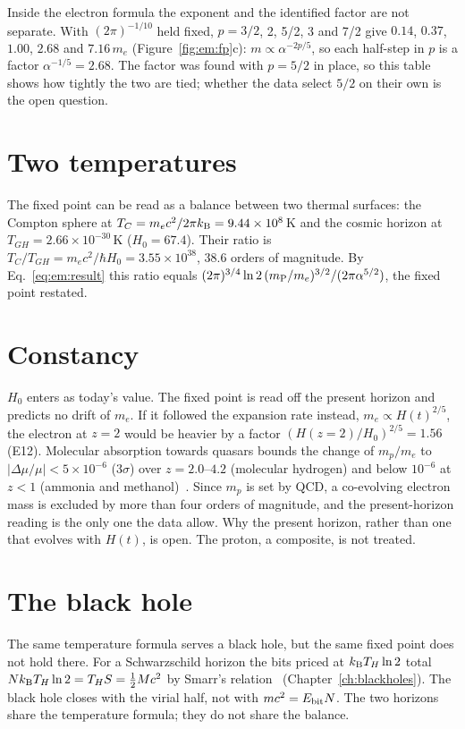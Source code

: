 Inside the electron formula the exponent and the identified factor are not separate. With $(2\pi)^{-1/10}$ held fixed, $p=3/2$, 2, 5/2, 3 and
7/2 give $0.14$, $0.37$, $1.00$, $2.68$ and $7.16\,m_e$ (Figure~\ref{fig:em:fp}c): $m\propto\alpha^{-2p/5}$, so each half-step in $p$ is a factor
$\alpha^{-1/5}=2.68$. \calc{} The factor was found with $p=5/2$ in place, so this table shows how tightly the two are tied; whether the data select $5/2$ on their own is the open question.

\section{Two temperatures}\label{sec:em:temps}
The fixed point can be read as a balance between two thermal surfaces: the Compton sphere at $T_C=m_ec^2/2\pi k_{\mathrm B}=9.44\times10^8$\,K and the cosmic
horizon at $T_{GH}=2.66\times10^{-30}$\,K ($H_0=67.4$). Their ratio is $T_C/T_{GH}=m_ec^2/\hbar H_0=3.55\times10^{38}$, 38.6 orders of magnitude. \calc{} By
Eq.~\eqref{eq:em:result} this ratio equals $(2\pi)^{3/4}\ln2\,(m_{\mathrm P}/m_e)^{3/2}/(2\pi\alpha^{5/2})$, the fixed point restated.

\section{Constancy}\label{sec:em:constancy}
$H_0$ enters as today's value. The fixed point is read off the present horizon and predicts no drift of $m_e$. If it followed the expansion
rate instead, $m_e\propto H(t)^{2/5}$, the electron at $z=2$ would be heavier by a factor $(H(z{=}2)/H_0)^{2/5}=1.56$ (E12). \calc{} Molecular
absorption towards quasars bounds the change of $m_p/m_e$ to $|\Delta\mu/\mu|<5\times10^{-6}$ ($3\sigma$) over $z=2.0$--$4.2$ (molecular hydrogen) and below $10^{-6}$ at $z<1$ (ammonia and methanol)~\cite{Ubachs2016}.
\observed{} Since $m_p$ is set by QCD, a co-evolving electron mass is excluded by more than four orders of magnitude, and the present-horizon reading
is the only one the data allow. Why the present horizon, rather than one that evolves with $H(t)$, is open. The proton, a composite, is not
treated. \openprob

\section{The black hole}\label{sec:em:bh}
The same temperature formula serves a black hole, but the same fixed point does not hold there. For a Schwarzschild horizon the bits priced at
$k_{\mathrm B} T_H\ln2$ total $Nk_{\mathrm B} T_H\ln2=T_HS=\tfrac12Mc^2$ by Smarr's relation~\cite{Smarr1973} (Chapter~\ref{ch:blackholes}). \derived{} The black hole
closes with the virial half, not with $mc^2=E_{\rm bit}N$. The two horizons share the temperature formula; they do not share the balance.

